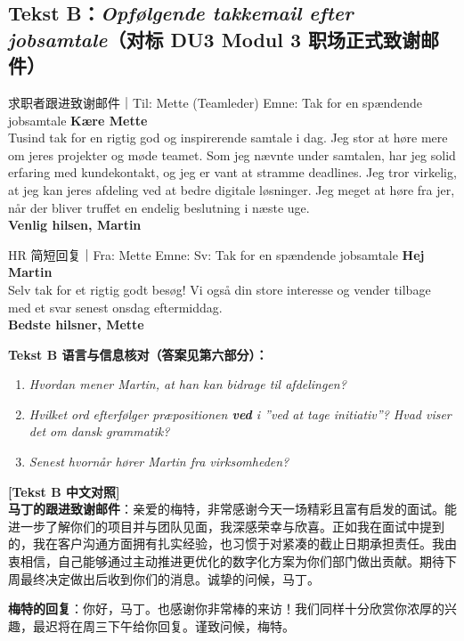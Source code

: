 \subsection*{Tekst B：\textit{Opfølgende takkemail efter jobsamtale}（对标 DU3 Modul 3 职场正式致谢邮件）}

\begin{emailbox}{求职者跟进致谢邮件｜Til: Mette (Teamleder) \quad Emne: Tak for en spændende jobsamtale}
\textbf{Kære Mette}\\
Tusind tak for en rigtig god og inspirerende samtale i dag. Jeg  stor   at høre mere om jeres projekter og møde teamet. Som jeg nævnte under samtalen, har jeg solid erfaring med kundekontakt, og jeg er vant  at   stramme deadlines. Jeg tror virkelig, at jeg kan   jeres afdeling ved at   bedre digitale løsninger. Jeg  meget   at høre fra jer, når der bliver truffet en endelig beslutning i næste uge.\\
\textbf{Venlig hilsen, Martin}
\end{emailbox}

\begin{emailbox}{HR 简短回复｜Fra: Mette \quad Emne: Sv: Tak for en spændende jobsamtale}
\textbf{Hej Martin}\\
Selv tak for et rigtig godt besøg! Vi  også   din store interesse og vender tilbage med et svar senest onsdag eftermiddag.\\
\textbf{Bedste hilsner, Mette}
\end{emailbox}

\textbf{Tekst B 语言与信息核对（答案见第六部分）：}
\begin{enumerate}
  \item \textit{Hvordan mener Martin, at han kan bidrage til afdelingen?} \underline{\hspace{5.5cm}}
  \item \textit{Hvilket ord efterfølger præpositionen \textbf{ved} i ”ved at tage initiativ”? Hvad viser det om dansk grammatik?} \underline{\hspace{4.5cm}}
  \item \textit{Senest hvornår hører Martin fra virksomheden?} \underline{\hspace{3.5cm}}
\end{enumerate}

\begin{transbox}
\small
\textbf{\color{NCDTeal}[Tekst B 中文对照]}\\
\textbf{马丁的跟进致谢邮件}：亲爱的梅特，非常感谢今天一场精彩且富有启发的面试。能进一步了解你们的项目并与团队见面，我深感荣幸与欣喜。正如我在面试中提到的，我在客户沟通方面拥有扎实经验，也习惯于对紧凑的截止日期承担责任。我由衷相信，自己能够通过主动推进更优化的数字化方案为你们部门做出贡献。期待下周最终决定做出后收到你们的消息。诚挚的问候，马丁。

\textbf{梅特的回复}：你好，马丁。也感谢你非常棒的来访！我们同样十分欣赏你浓厚的兴趣，最迟将在周三下午给你回复。谨致问候，梅特。
\end{transbox}

